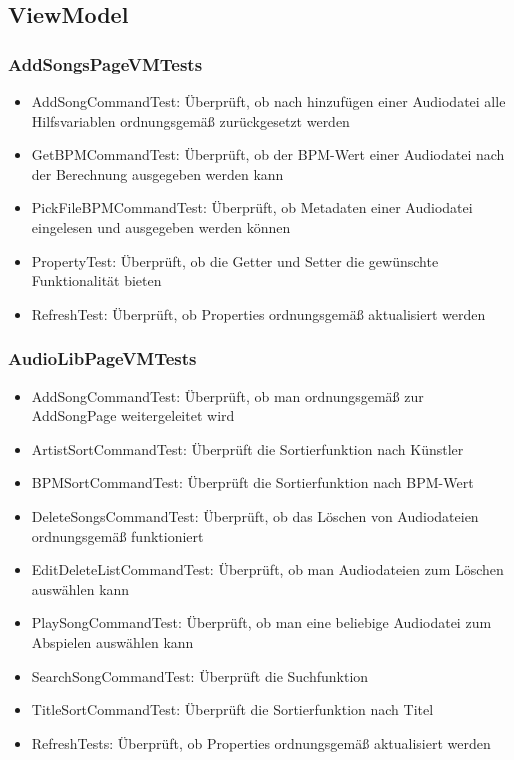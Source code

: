 \documentclass[../validierung.tex]{subfiles}
\begin{document}
	\subsection{ViewModel}
		\subsubsection{AddSongsPageVMTests}
			\begin{itemize}
				\item AddSongCommandTest: Überprüft, ob nach hinzufügen einer Audiodatei alle Hilfsvariablen ordnungsgemäß zurückgesetzt werden
				\item GetBPMCommandTest: Überprüft, ob der BPM-Wert einer Audiodatei nach der Berechnung ausgegeben werden kann
				\item PickFileBPMCommandTest: Überprüft, ob Metadaten einer Audiodatei eingelesen und ausgegeben werden können
				\item PropertyTest: Überprüft, ob die Getter und Setter die gewünschte Funktionalität bieten
				\item RefreshTest: Überprüft, ob Properties ordnungsgemäß aktualisiert werden
			\end{itemize}
		\subsubsection{AudioLibPageVMTests}
			\begin{itemize}
				\item AddSongCommandTest: Überprüft, ob man ordnungsgemäß zur AddSongPage weitergeleitet wird
				\item ArtistSortCommandTest: Überprüft die Sortierfunktion nach Künstler 
				\item BPMSortCommandTest: Überprüft die Sortierfunktion nach BPM-Wert
				\item DeleteSongsCommandTest: Überprüft, ob das Löschen von Audiodateien ordnungsgemäß funktioniert
				\item EditDeleteListCommandTest: Überprüft, ob man Audiodateien zum Löschen auswählen kann
				\item PlaySongCommandTest: Überprüft, ob man eine beliebige Audiodatei zum Abspielen auswählen kann
				\item SearchSongCommandTest: Überprüft die Suchfunktion
				\item TitleSortCommandTest: Überprüft die Sortierfunktion nach Titel
				\item RefreshTests: Überprüft, ob Properties ordnungsgemäß aktualisiert werden
			\end{itemize}
\end{document}
